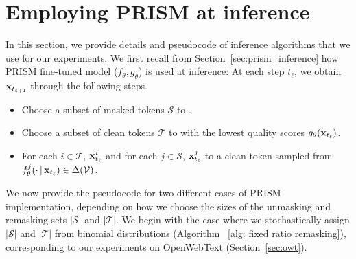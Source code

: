 \newpage
\section{Employing PRISM at inference}
In this section, we provide details and pseudocode of inference algorithms that we use for our experiments. We first recall from Section~\ref{sec:prism_inference} how PRISM fine-tuned model ($f_\theta,g_\theta$) is used at inference: At each step $t_\ell$, we obtain ${\mathbf{x}}_{t_{\ell+1}}$ through the following steps.
\begin{itemize}[leftmargin=17pt, noitemsep, parsep=3pt, topsep=0pt]
    \item[(a)] Choose a subset of masked tokens $\mathcal{S}$ to .
    \item[(b)] Choose a subset of clean tokens $\mathcal{T}$ to  with the lowest quality scores $g_\theta({\mathbf{x}}_{t_{\ell}})$.
    \item[(c)] For each $i\in\mathcal{T}$,  ${\mathbf{x}}_{t_\ell}^i$ and for each $j\in\mathcal{S}$,  ${\mathbf{x}}_{t_\ell}^j$ to a clean token sampled from $f_\theta^j(\cdot\,|\, {\mathbf{x}}_{t_\ell})\in\Delta(\mathcal{V})$.
\end{itemize}
We now provide the pseudocode for two different cases of PRISM implementation, depending on how we choose the sizes of the unmasking and remasking sets $|\mathcal{S}|$ and $|\mathcal{T}|$. We begin with the case where we stochastically assign $|\mathcal{S}|$ and $|\mathcal{T}|$ from binomial distributions (Algorithm ~\ref{alg: fixed ratio remasking}), corresponding to our experiments on OpenWebText (Section~\ref{sec:owt}).

